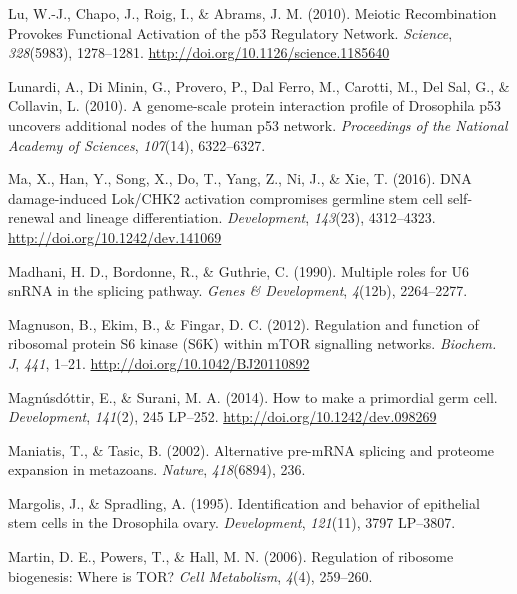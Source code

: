 \documentclass[12pt,twoside]{reedthesis}
\newlength{\cslhangindent}
\newenvironment{cslreferences}%
  {\setlength{\parindent}{0pt}%
  \everypar{\setlength{\hangindent}{\cslhangindent}}\ignorespaces}%
  {\par}
\begin{document}
\begin{cslreferences}
\leavevmode\hypertarget{ref-luMeioticRecombinationProvokes2010}{}%
Lu, W.-J., Chapo, J., Roig, I., \& Abrams, J. M. (2010). Meiotic Recombination Provokes Functional Activation of the p53 Regulatory Network. \emph{Science}, \emph{328}(5983), 1278--1281. \url{http://doi.org/10.1126/science.1185640}

\leavevmode\hypertarget{ref-Lunardi2010a}{}%
Lunardi, A., Di Minin, G., Provero, P., Dal Ferro, M., Carotti, M., Del Sal, G., \& Collavin, L. (2010). A genome-scale protein interaction profile of Drosophila p53 uncovers additional nodes of the human p53 network. \emph{Proceedings of the National Academy of Sciences}, \emph{107}(14), 6322--6327.

\leavevmode\hypertarget{ref-maDNADamageinducedLok2016}{}%
Ma, X., Han, Y., Song, X., Do, T., Yang, Z., Ni, J., \& Xie, T. (2016). DNA damage-induced Lok/CHK2 activation compromises germline stem cell self-renewal and lineage differentiation. \emph{Development}, \emph{143}(23), 4312--4323. \url{http://doi.org/10.1242/dev.141069}

\leavevmode\hypertarget{ref-Madhani1990}{}%
Madhani, H. D., Bordonne, R., \& Guthrie, C. (1990). Multiple roles for U6 snRNA in the splicing pathway. \emph{Genes \& Development}, \emph{4}(12b), 2264--2277.

\leavevmode\hypertarget{ref-Magnuson2012c}{}%
Magnuson, B., Ekim, B., \& Fingar, D. C. (2012). Regulation and function of ribosomal protein S6 kinase (S6K) within mTOR signalling networks. \emph{Biochem. J}, \emph{441}, 1--21. \url{http://doi.org/10.1042/BJ20110892}

\leavevmode\hypertarget{ref-Magnusdottir2014d}{}%
Magnúsdóttir, E., \& Surani, M. A. (2014). How to make a primordial germ cell. \emph{Development}, \emph{141}(2), 245 LP--252. \url{http://doi.org/10.1242/dev.098269}

\leavevmode\hypertarget{ref-Maniatis2002}{}%
Maniatis, T., \& Tasic, B. (2002). Alternative pre-mRNA splicing and proteome expansion in metazoans. \emph{Nature}, \emph{418}(6894), 236.

\leavevmode\hypertarget{ref-Margolis1995a}{}%
Margolis, J., \& Spradling, A. (1995). Identification and behavior of epithelial stem cells in the Drosophila ovary. \emph{Development}, \emph{121}(11), 3797 LP--3807.

\leavevmode\hypertarget{ref-Martin2006a}{}%
Martin, D. E., Powers, T., \& Hall, M. N. (2006). Regulation of ribosome biogenesis: Where is TOR? \emph{Cell Metabolism}, \emph{4}(4), 259--260.


\end{cslreferences}
\end{document}
